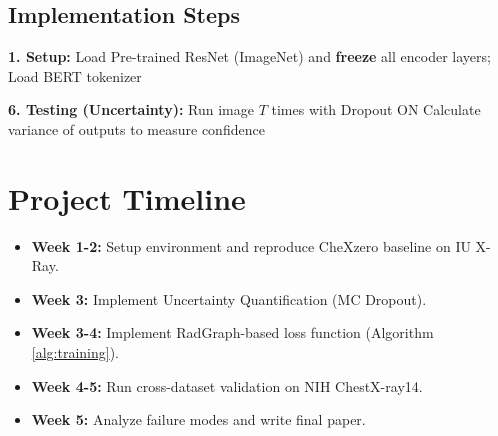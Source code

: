 \documentclass[11pt,a4paper]{article}
\begin{document}
\subsection{Implementation Steps}

\begin{algorithm}[H]
\label{alg:training}
\SetAlgoLined
\DontPrintSemicolon
{}

\textbf{1. Setup:} Load Pre-trained ResNet (ImageNet) and \textbf{freeze} all encoder layers; Load BERT tokenizer\;

\textbf{6. Testing (Uncertainty):}\;
Run image $T$ times with Dropout ON\;
Calculate variance of outputs to measure confidence\;

\caption{Training and Testing Logic}
\end{algorithm}

\section{Project Timeline}
\begin{itemize}
    \item \textbf{Week 1-2:} Setup environment and reproduce CheXzero baseline on IU X-Ray.
    \item \textbf{Week 3:} Implement Uncertainty Quantification (MC Dropout).
    \item \textbf{Week 3-4:} Implement RadGraph-based loss function (Algorithm \ref{alg:training}).
    \item \textbf{Week 4-5:} Run cross-dataset validation on NIH ChestX-ray14.
    \item \textbf{Week 5:} Analyze failure modes and write final paper.
\end{itemize}
\end{document}
